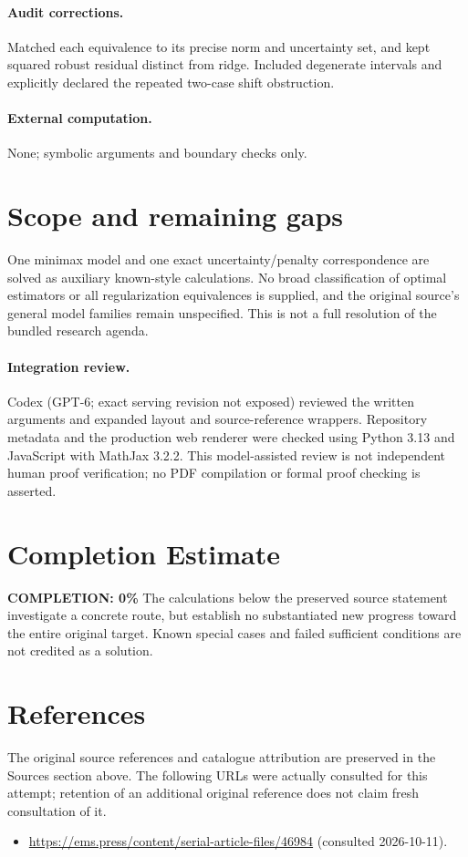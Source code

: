\documentclass[11pt]{article}
\begin{document}
\paragraph{Audit corrections.} Matched each equivalence to its precise norm and uncertainty set, and
kept squared robust residual distinct from ridge. Included degenerate intervals
and explicitly declared the repeated two-case shift obstruction.
\paragraph{External computation.} None; symbolic arguments and boundary checks only.
\section{Scope and remaining gaps}

One minimax model and one exact uncertainty/penalty correspondence are solved
as auxiliary known-style calculations. No broad classification of optimal
estimators or all regularization equivalences is supplied, and the original
source's general model families remain unspecified. This is not a full resolution
of the bundled research agenda.

\paragraph{Integration review.} Codex (GPT-6; exact serving revision not exposed) reviewed the written arguments and expanded layout and source-reference wrappers. Repository metadata and the production web renderer were checked using Python 3.13 and JavaScript with MathJax 3.2.2. This model-assisted review is not independent human proof verification; no PDF compilation or formal proof checking is asserted.

\section{Completion Estimate}
\noindent\textbf{COMPLETION: 0\%}
The calculations below the preserved source statement investigate a concrete route,
but establish no substantiated new progress toward the entire original target.
Known special cases and failed sufficient conditions are not credited as a solution.
\section{References}
The original source references and catalogue attribution are preserved in the
Sources section above. The following URLs were actually consulted for this attempt;
retention of an additional original reference does not claim fresh consultation of it.
\begin{itemize}
\item \url{https://ems.press/content/serial-article-files/46984} (consulted 2026-10-11). 
\end{itemize}
\end{document}

